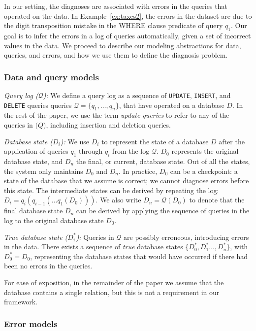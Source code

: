 In our setting, the diagnoses are associated with errors in the queries that
operated on the data. In Example~\ref{ex:taxes2}, the errors in the dataset
are due to the digit transposition mistake in the WHERE clause predicate of
query $q_1$. Our goal is to infer the errors in a log of queries
automatically, given a set of incorrect values in the data. We proceed to
describe our modeling abstractions for data, queries, and errors, and how we
use them to define the diagnosis problem.

\subsubsection*{Data and query models}

\noindent
\emph{Query log ($\mathcal{Q}$):}
We define a query log as a sequence of \texttt{UPDATE}, \texttt{INSERT}, and
\texttt{DELETE} queries queries $\mathcal{Q}=\{q_1,\dots,q_n\}$, that have
operated on a database $D$. In the rest of the paper, we use the term
\emph{update queries} to refer to any of the queries in $\mathcal(Q)$,
including insertion and deletion queries.

\smallskip
\noindent
\emph{Database state ($D_i$):}
We use $D_i$ to represent the state of a database $D$ after the application of
queries $q_1$ through $q_i$ from the log $\mathcal{Q}$. $D_0$ represents the
original database state, and $D_n$ the final, or current, database state. Out
of all the states, the system only maintains $D_0$ and $D_n$. In practice,
$D_0$ can be a checkpoint: a state of the database that we assume is correct;
we cannot diagnose errors before this state. The intermediate states can be
derived by repeating the log: $D_i=q_i(q_{i-1}(\dots q_1(D_0)))$. We also
write $D_n=\mathcal{Q}(D_0)$ to denote that the final database state $D_n$ can
be derived by applying the sequence of queries in the log to the original
database state $D_0$.

\smallskip
\noindent
\emph{True database state ($D_i^*$):}
Queries in $\mathcal{Q}$ are possibly erroneous, introducing errors in the
data. There exists a sequence of \emph{true} database states $\{D_0^*,
D_1^*\dots, D_n^*\}$, with $D_0^*=D_0$, representing the database states that
would have occurred if there had been no errors in the queries.

For ease of exposition, in the remainder of the paper we assume that the
database contains a single relation, but this is not a requirement in our
framework.


\subsubsection*{Error models}

